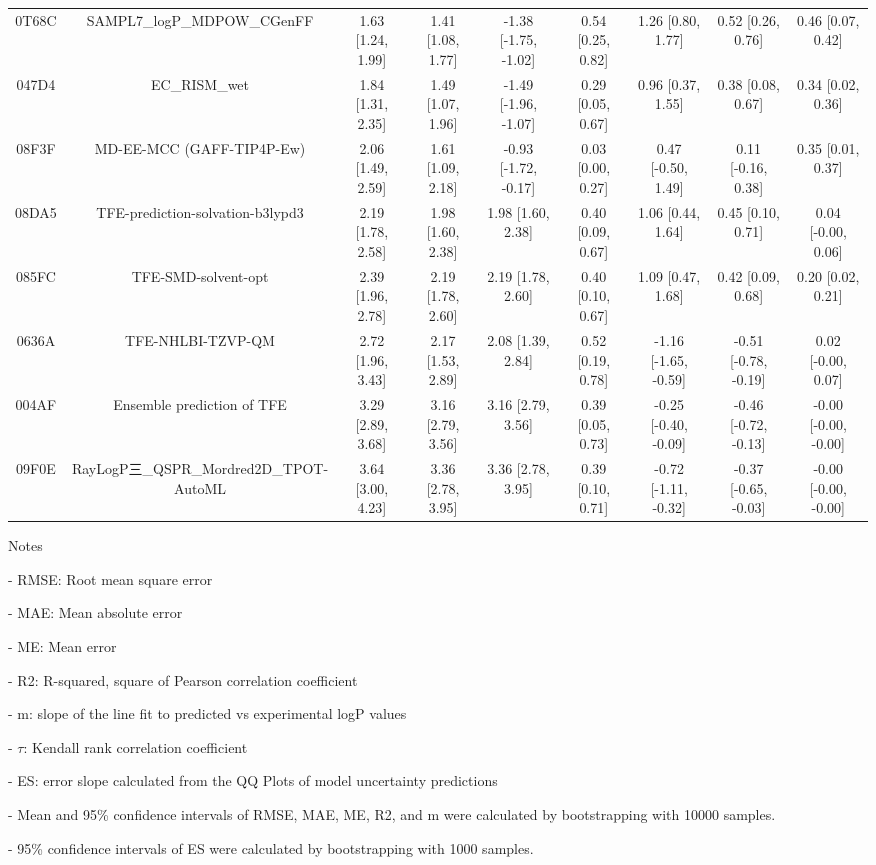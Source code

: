 \documentclass{article}
\begin{document}
\begin{center}
\begin{longtable}{|ccccccccc|}
 0T68C &             SAMPL7\_logP\_MDPOW\_CGenFF &  1.63 [1.24, 1.99] &  1.41 [1.08, 1.77] &  -1.38 [-1.75, -1.02] &  0.54 [0.25, 0.82] &     1.26 [0.80, 1.77] &     0.52 [0.26, 0.76] &     0.46 [0.07, 0.42] \\
 047D4 &                           EC\_RISM\_wet &  1.84 [1.31, 2.35] &  1.49 [1.07, 1.96] &  -1.49 [-1.96, -1.07] &  0.29 [0.05, 0.67] &     0.96 [0.37, 1.55] &     0.38 [0.08, 0.67] &     0.34 [0.02, 0.36] \\
 08F3F &               MD-EE-MCC (GAFF-TIP4P-Ew) &  2.06 [1.49, 2.59] &  1.61 [1.09, 2.18] &  -0.93 [-1.72, -0.17] &  0.03 [0.00, 0.27] &    0.47 [-0.50, 1.49] &    0.11 [-0.16, 0.38] &     0.35 [0.01, 0.37] \\
 08DA5 &        TFE-prediction-solvation-b3lypd3 &  2.19 [1.78, 2.58] &  1.98 [1.60, 2.38] &     1.98 [1.60, 2.38] &  0.40 [0.09, 0.67] &     1.06 [0.44, 1.64] &     0.45 [0.10, 0.71] &    0.04 [-0.00, 0.06] \\
 085FC &                     TFE-SMD-solvent-opt &  2.39 [1.96, 2.78] &  2.19 [1.78, 2.60] &     2.19 [1.78, 2.60] &  0.40 [0.10, 0.67] &     1.09 [0.47, 1.68] &     0.42 [0.09, 0.68] &     0.20 [0.02, 0.21] \\
 0636A &                       TFE-NHLBI-TZVP-QM &  2.72 [1.96, 3.43] &  2.17 [1.53, 2.89] &     2.08 [1.39, 2.84] &  0.52 [0.19, 0.78] &  -1.16 [-1.65, -0.59] &  -0.51 [-0.78, -0.19] &    0.02 [-0.00, 0.07] \\
 004AF &              Ensemble prediction of TFE &  3.29 [2.89, 3.68] &  3.16 [2.79, 3.56] &     3.16 [2.79, 3.56] &  0.39 [0.05, 0.73] &  -0.25 [-0.40, -0.09] &  -0.46 [-0.72, -0.13] &  -0.00 [-0.00, -0.00] \\
 09F0E &  RayLogP三\_QSPR\_Mordred2D\_TPOT-AutoML &  3.64 [3.00, 4.23] &  3.36 [2.78, 3.95] &     3.36 [2.78, 3.95] &  0.39 [0.10, 0.71] &  -0.72 [-1.11, -0.32] &  -0.37 [-0.65, -0.03] &  -0.00 [-0.00, -0.00] \\
\end{longtable}
\end{center}

Notes

- RMSE: Root mean square error

- MAE: Mean absolute error

- ME: Mean error

- R2: R-squared, square of Pearson correlation coefficient

- m: slope of the line fit to predicted vs experimental logP values

- $\tau$:  Kendall rank correlation coefficient

- ES: error slope calculated from the QQ Plots of model uncertainty predictions

- Mean and 95\% confidence intervals of RMSE, MAE, ME, R2, and m were calculated by bootstrapping with 10000 samples.

- 95\% confidence intervals of ES were calculated by bootstrapping with 1000 samples.\end{document}
\end{document}
